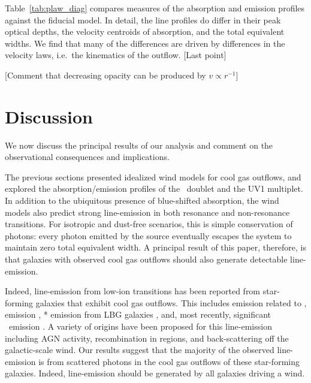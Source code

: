 \documentclass[12pt,preprint]{aastex}
\begin{document}
Table~\ref{tab:plaw_diag} compares measures of the absorption and
emission profiles against the fiducial model.
In detail, the line profiles do differ in their peak optical depths,
the velocity centroids of absorption, and the total equivalent widths.
We find that many of the differences are driven by differences in
the velocity laws, i.e.\ the kinematics of the outflow.
[Last point]

[Comment that decreasing opacity can be produced by $v \propto
r^{-1}$]

\section{Discussion}
\label{sec:discuss}

We now discuss the principal results of our analysis and comment on
the observational consequences and implications. 

The previous sections presented idealized wind models for
cool gas outflows, and explored the absorption/emission profiles of
the \mgiid\ doublet and the  UV1 multiplet.  In addition to
the ubiquitous presence of blue-shifted absorption, the wind models
also predict strong line-emission in both resonance
and non-resonance transitions.  For isotropic and dust-free scenarios,
this is simple conservation of photons: every photon emitted by
the source eventually escapes the system to maintain
zero total equivalent width. A principal result of this paper,
therefore, is that galaxies with observed cool gas outflows should
also generate detectable line-emission.
 
Indeed, line-emission from low-ion transitions has been reported from 
star-forming galaxies that exhibit cool gas outflows.  
This includes emission related to  \citep{phillips93,cth+10},
 emission \citep{wcp+09,rwk+10}, 
* emission from LBG galaxies \citep{shapley03},
and, most recently, significant \feiis\ emission \citep{rubin+10c}. 
A variety of origins have been proposed for this
line-emission including AGN activity, recombination in 
regions, and back-scattering off the galactic-scale wind.
Our results suggest that the majority of the observed line-emission is 
from scattered photons in the cool gas outflows of these star-forming
galaxies.  Indeed, line-emission should be generated by all 
galaxies driving a wind.
\end{document}
